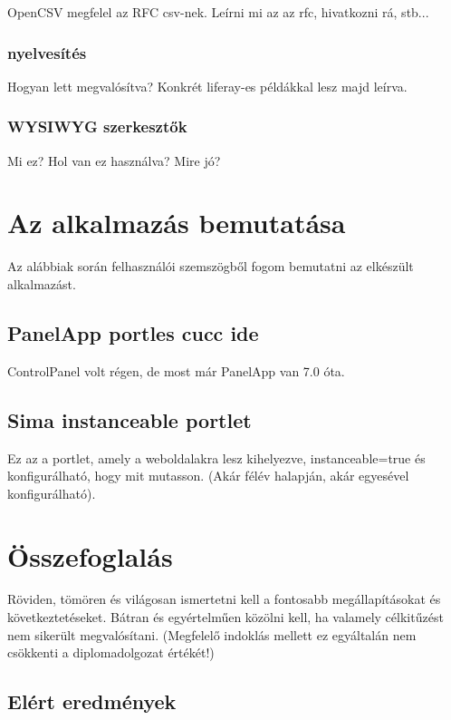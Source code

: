 \documentclass[hidelinks, 12pt, a4paper]{report}
\begin{document}
OpenCSV megfelel az RFC csv-nek. Leírni mi az az rfc, hivatkozni rá, stb...

\subsection{nyelvesítés}

Hogyan lett megvalósítva? Konkrét liferay-es példákkal lesz majd leírva.

\subsection{WYSIWYG szerkesztők}

Mi ez? Hol van ez használva? Mire jó?

\chapter{Az alkalmazás bemutatása}

Az alábbiak során felhasználói szemszögből fogom bemutatni az elkészült alkalmazást.

\section{PanelApp portles cucc ide}

ControlPanel volt régen, de most már PanelApp van 7.0 óta.

\section{Sima instanceable portlet}

Ez az a portlet, amely a weboldalakra lesz kihelyezve, instanceable=true és konfigurálható, hogy mit mutasson. (Akár félév halapján, akár egyesével konfigurálható).

\chapter{Összefoglalás}

Röviden, tömören és világosan ismertetni kell a fontosabb megállapításokat és következtetéseket. Bátran és egyértelműen közölni kell, ha valamely célkitűzést nem sikerült megvalósítani. (Megfelelő indoklás mellett ez egyáltalán nem csökkenti a diplomadolgozat értékét!)

\section{Elért eredmények}
\end{document}
